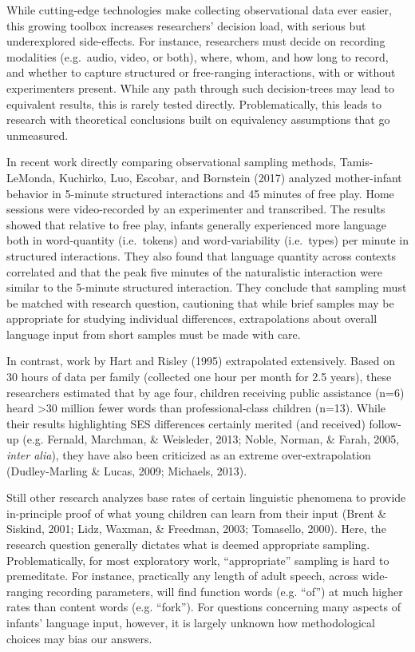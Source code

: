 \documentclass[man]{apa6}
\theoremstyle{definition}
\theoremstyle{definition}
\theoremstyle{definition}
\theoremstyle{remark}
\begin{document}
While cutting-edge technologies make collecting observational data ever
easier, this growing toolbox increases researchers' decision load, with
serious but underexplored side-effects. For instance, researchers must
decide on recording modalities (e.g.~audio, video, or both), where,
whom, and how long to record, and whether to capture structured or
free-ranging interactions, with or without experimenters present. While
any path through such decision-trees may lead to equivalent results,
this is rarely tested directly. Problematically, this leads to research
with theoretical conclusions built on equivalency assumptions that go
unmeasured.

In recent work directly comparing observational sampling methods,
Tamis-LeMonda, Kuchirko, Luo, Escobar, and Bornstein (2017) analyzed
mother-infant behavior in 5-minute structured interactions and 45
minutes of free play. Home sessions were video-recorded by an
experimenter and transcribed. The results showed that relative to free
play, infants generally experienced more language both in word-quantity
(i.e.~tokens) and word-variability (i.e.~types) per minute in structured
interactions. They also found that language quantity across contexts
correlated and that the peak five minutes of the naturalistic
interaction were similar to the 5-minute structured interaction. They
conclude that sampling must be matched with research question,
cautioning that while brief samples may be appropriate for studying
individual differences, extrapolations about overall language input from
short samples must be made with care.

In contrast, work by Hart and Risley (1995) extrapolated extensively.
Based on 30 hours of data per family (collected one hour per month for
2.5 years), these researchers estimated that by age four, children
receiving public assistance (n=6) heard \textgreater{}30 million fewer
words than professional-class children (n=13). While their results
highlighting SES differences certainly merited (and received) follow-up
(e.g. Fernald, Marchman, \& Weisleder, 2013; Noble, Norman, \& Farah,
2005, \emph{inter alia}), they have also been criticized as an extreme
over-extrapolation (Dudley-Marling \& Lucas, 2009; Michaels, 2013).

Still other research analyzes base rates of certain linguistic phenomena
to provide in-principle proof of what young children can learn from
their input (Brent \& Siskind, 2001; Lidz, Waxman, \& Freedman, 2003;
Tomasello, 2000). Here, the research question generally dictates what is
deemed appropriate sampling. Problematically, for most exploratory work,
\enquote{appropriate} sampling is hard to premeditate. For instance,
practically any length of adult speech, across wide-ranging recording
parameters, will find function words (e.g. \enquote{of}) at much higher
rates than content words (e.g. \enquote{fork}). For questions concerning
many aspects of infants' language input, however, it is largely unknown
how methodological choices may bias our answers.
\end{document}
